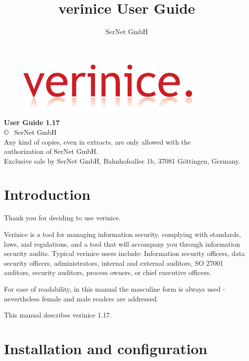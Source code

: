 \documentclass[a4paper,10pt]{book}
\title{verinice User Guide \vnversion{}}
\author{SerNet GmbH}
\newcommand*{\vnversion}{1.17}
\begin{document}

\begin{titlepage}
    \centering
    \vspace{1cm}
    \begin{figure}[htb!]
      \centering
      \colorbox{white}{\includegraphics{Image/logo.pdf}}
    \end{figure}
    \huge\textbf{User Guide \vnversion{}}\\
    \vspace{14cm}
    \normalsize
  \copyright{} \the\year\ SerNet GmbH\\
  Any kind of copies, even in extracts, are only allowed with the\\
  authorization of SerNet GmbH.\\
  Exclusive sale by SerNet GmbH, Bahnhofsallee 1b, 37081 Göttingen, Germany.
\end{titlepage}

\tableofcontents

\listoftables

\listoffigures

\chapter{Introduction}
Thank you for deciding to use verinice.

Verinice is a tool for managing information security, complying with standards,
laws, and regulations, and a tool that will accompany you through information
security audits. Typical verinice users include: Information security officers,
data security officers, administrators, internal and external auditors,
SO 27001 auditors, security auditors, process owners, or chief executive
officers.

For ease of readability, in this manual the masculine form is always used -
nevertheless female and male readers are addressed.

This manual describes verinice \vnversion{}.

\newpage
\chapter{Installation and configuration}
\end{document}
